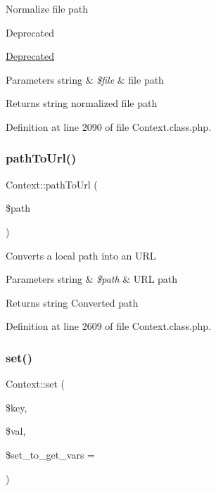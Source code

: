 Normalize file path

\begin{DoxyRefDesc}{Deprecated}
\item[\hyperlink{deprecated__deprecated000002}{Deprecated}]\end{DoxyRefDesc}

\begin{DoxyParams}[1]{Parameters}
string & {\em \$file} & file path \\
\hline
\end{DoxyParams}
\begin{DoxyReturn}{Returns}
string normalized file path 
\end{DoxyReturn}


Definition at line 2090 of file Context.\+class.\+php.

\hypertarget{classContext_a6012ceb6e62fc99b0e2b24e475ba4da7}{}\label{classContext_a6012ceb6e62fc99b0e2b24e475ba4da7} 
\subsubsection{\texorpdfstring{path\+To\+Url()}{pathToUrl()}}
{\footnotesize\ttfamily Context\+::path\+To\+Url (\begin{DoxyParamCaption}\item[{}]{\$path }\end{DoxyParamCaption})}

Converts a local path into an U\+RL


\begin{DoxyParams}[1]{Parameters}
string & {\em \$path} & U\+RL path \\
\hline
\end{DoxyParams}
\begin{DoxyReturn}{Returns}
string Converted path 
\end{DoxyReturn}


Definition at line 2609 of file Context.\+class.\+php.

\hypertarget{classContext_a9f79aa7aecf2e4d8006e517844523fc2}{}\label{classContext_a9f79aa7aecf2e4d8006e517844523fc2} 
\subsubsection{\texorpdfstring{set()}{set()}}
{\footnotesize\ttfamily Context\+::set (\begin{DoxyParamCaption}\item[{}]{\$key,  }\item[{}]{\$val,  }\item[{}]{\$set\+\_\+to\+\_\+get\+\_\+vars = {} }\end{DoxyParamCaption})}


